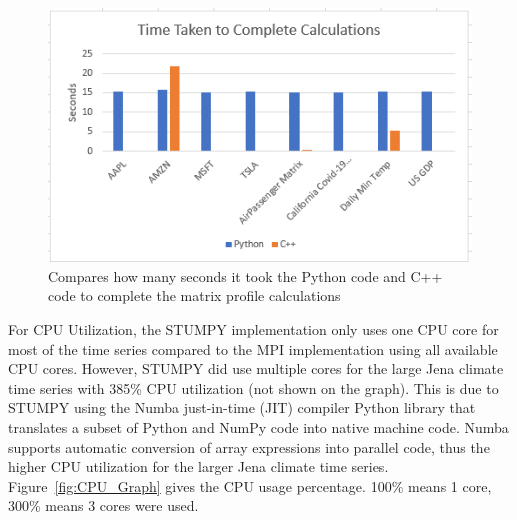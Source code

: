 \documentclass[conference]{IEEEtran}
\begin{document}
\begin{figure}
\begin{center}
\includegraphics[scale=1.05]{Time.png}
\caption{Compares how many seconds it took the Python code and C++ code to complete the matrix profile calculations}
\label{fig:Time_Graph}
\end{center}
\end{figure}
For CPU Utilization, the STUMPY implementation only uses one CPU core for most of the time series compared to the MPI implementation using all available CPU cores.  However, STUMPY did use multiple cores for the large Jena climate time series with 385\% CPU utilization (not shown on the graph).  This is due to STUMPY using the Numba just-in-time (JIT) compiler Python library that translates a subset of Python and NumPy code into native machine code.  Numba supports automatic conversion of array expressions into parallel code\cite{Numba}, thus the higher CPU utilization for the larger Jena climate time series.  Figure~\ref{fig:CPU_Graph} gives the CPU usage percentage. 100\% means 1 core, 300\% means 3 cores were used.
\end{document}
